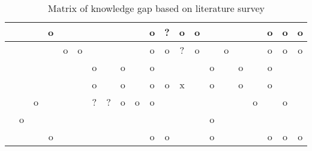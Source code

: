 \begin{table}
\begin{tabular}{|c||c|c|c|c|c|c|c|c|c|c|c|c|c|c|c|c|c|c|c|c|}
\hhline{|=::====================|}
\multicolumn{1}{|c||}{\cite{wheeler_virtual_2018}} & & & o & & & & & & & o & ? & o & o & & & & & o & o & o \\ 
\hline
\cite{oleary_enhancements_2017} & & & & o & o & & & & & o & o & ? & o & & o & & & o & o & o \\
\hline
\cite{dreuning_visual_2016} & & & & & & o & & o & & o & \texttildelow{} & \texttildelow{} & & o & & o & & o & & \\ 
\hline
\cite{kruis_creating_2017} & & & & & & o & & o & \texttildelow{} & o & o & x & & o & & o & & o & & \\ 
\hline
\cite{shutte_virtual_2018} & & o & & & & ? & ? & o & o & o & \texttildelow{} & & & & & & o & & o & \\ 
\hline
\cite{hanak_opengl_2003} & o & & & & & & & & & & & & & o & & & & & & \\ 
\hline
\multicolumn{1}{|c||}{\cite{noauthor_activiz_nodate}} & & & o & & & & & & & o & o & \texttildelow{} & & o & & & & o & o & o \\
\hline
\end{tabular}
\label{tab:gaps}
\caption{Matrix of knowledge gap based on literature survey}
\end{table}